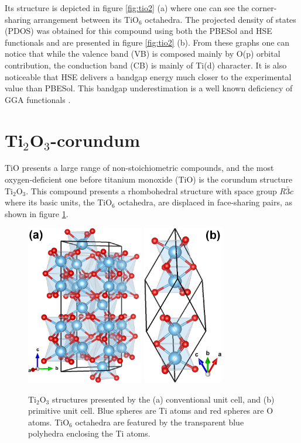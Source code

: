 Its structure is depicted in figure \ref{fig:tio2} (a) where one can see the corner-sharing arrangement between its TiO$_6$ octahedra. The projected density of states (PDOS) was obtained for this compound using both the PBESol and HSE functionals and are presented in figure \ref{fig:tio2} (b). From these graphs one can notice that while the valence band (VB) is composed mainly by O(p) orbital contribution, the conduction band (CB) is mainly of Ti(d) character. It is also noticeable that HSE delivers a bandgap energy much closer to the experimental value than PBESol. This bandgap underestimation is a well known deficiency of GGA functionals \cite{Perdew2001}.

\section{Ti$_2$O$_3$-corundum}
\label{sec:ti2o3}

TiO presents a large range of non-stoichiometric compounds, and the most oxygen-deficient one before titanium monoxide (TiO) is the corundum structure Ti$_2$O$_3$. This compound presents a rhombohedral structure with space group $R\bar{3}c$ where its basic units, the TiO$_6$ octahedra, are displaced in face-sharing pairs, as shown in figure \ref{fig:struct-ti2o3}.
\begin{figure}[!ht]
 \centering
  \includegraphics[height=7cm]{img/ti2o3-conv.jpg}
  \qquad
  \includegraphics[height=7cm]{img/ti2o3-prim.jpg}
  \caption{Ti$_2$O$_3$ structures presented by the (a) conventional unit cell, and (b) primitive unit cell. Blue spheres are Ti atoms and red spheres are O atoms. TiO$_6$ octahedra are featured by the transparent blue polyhedra enclosing the Ti atoms.} 
  \label{fig:struct-ti2o3}
\end{figure}

